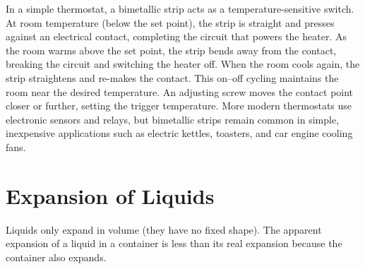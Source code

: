 \begin{diagbox}
\begin{center}
\end{center}
\end{diagbox}

\begin{realworldbox}
In a simple thermostat, a bimetallic strip acts as a
temperature-sensitive switch. At room temperature
(below the set point), the strip is straight and
presses against an electrical contact, completing
the circuit that powers the heater. As the room
warms above the set point, the strip bends away from
the contact, breaking the circuit and switching the
heater off. When the room cools again, the strip
straightens and re-makes the contact. This
on--off cycling maintains the room near the desired
temperature. An adjusting screw moves the contact
point closer or further, setting the trigger
temperature. More modern thermostats use electronic
sensors and relays, but bimetallic strips remain
common in simple, inexpensive applications such as
electric kettles, toasters, and car engine cooling
fans.
\end{realworldbox}

\section{Expansion of Liquids}

Liquids only expand in volume (they have no fixed shape).
The apparent expansion of a liquid in a container is
less than its real expansion because the container also
expands.

